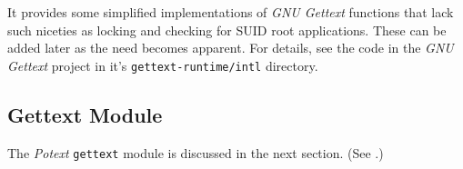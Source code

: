    It provides some simplified implementations of
   \textsl{GNU Gettext} functions that lack such niceties as
   locking and checking for SUID root applications.
   These can be added later as the need becomes apparent.
   For details, see the code in the 
   \textsl{GNU Gettext} project in it's
   \texttt{gettext-runtime/intl} directory.

\subsection{Gettext Module}
\label{subsec:potext_gettext_module}

   The \textsl{Potext} \texttt{gettext} module is discussed in the next
   section.
   (See .)

